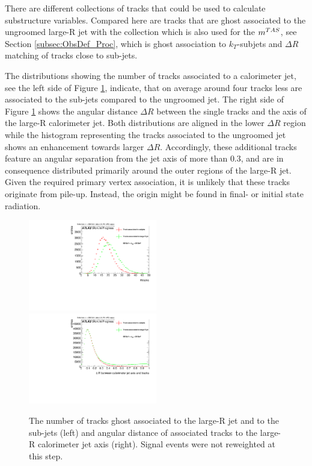 There are different collections of tracks that could be used to calculate substructure variables. Compared here are tracks that are ghost associated to the ungroomed large-R jet with the collection which is also used for the $m^{TAS}$, see Section \ref{subsec:ObsDef_Proc}, which is ghost association to $k_T$-subjets and $\Delta R$ matching of tracks close to sub-jets.

The distributions showing the number of tracks associated to a calorimeter jet, see the left side of Figure \ref{fig:delta_R}, indicate, that on average around four tracks less are associated to the sub-jets compared to the ungroomed jet. The right side of Figure \ref{fig:delta_R} shows the angular distance $\Delta R$ between the single tracks and the axis of the large-R calorimeter jet. Both distributions are aligned in the lower $\Delta R$ region while the histogram representing the tracks associated to the ungroomed jet shows an enhancement towards larger $\Delta R$. Accordingly, these additional tracks feature an angular separation from the jet axis of more than $0.3$, and are in consequence distributed primarily around the outer regions of the large-R jet. Given the required primary vertex association, it is unlikely that these tracks originate from pile-up. Instead, the origin might be found in final- or initial state radiation. 
\begin{figure}
	\includegraphics[width=0.5\textwidth]{sascha_input/plots/track_selection/h_customghost_number.pdf} \hspace{1mm}
	\includegraphics[width=0.5\textwidth]{sascha_input/plots/track_selection/h_customghost_dr.pdf}
\caption{\footnotesize{The number of tracks ghost associated to the large-R jet and to the sub-jets (left) and angular distance of associated tracks to the large-R calorimeter jet axis (right). Signal events were not reweighted at this step.}}\label{fig:delta_R}
\end{figure}

